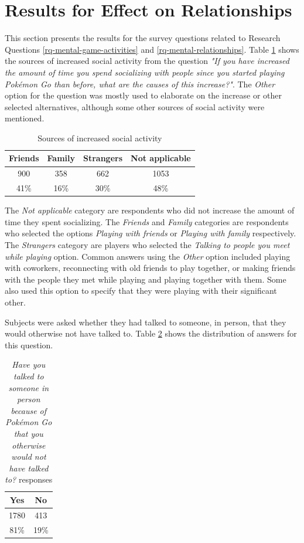 \section{Results for Effect on Relationships}

This section presents the results for the survey questions related to Research Questions \ref{rq-mental-game-activities} and \ref{rq-mental-relationships}. Table \ref{tbl:increased-social-activity-sources} shows the sources of increased social activity from the question \emph{"If you have increased the amount of time you spend socializing with people since you started playing Pokémon Go than before, what are the causes of this increase?"}. The \emph{Other} option for the question was mostly used to elaborate on the increase or other selected alternatives, although some other sources of social activity were mentioned.

\begin{table}[h]
	\centering
	\caption{Sources of increased social activity}
	\label{tbl:increased-social-activity-sources}
	\begin{tabular}{|c|c|c|c|}
		\hline
		\textbf{Friends} & \textbf{Family} & \textbf{Strangers} & \textbf{Not applicable}\\
		\hline\hline
		900		& 358	& 662	& 1053\\
		41\%	& 16\%	& 30\%	& 48\%\\\hline
	\end{tabular}
\end{table}

The \emph{Not applicable} category are respondents who did not increase the amount of time they spent socializing. The \emph{Friends} and \emph{Family} categories are respondents who selected the options \emph{Playing with friends} or \emph{Playing with family} respectively. The \emph{Strangers} category are players who selected the \emph{Talking to people you meet while playing} option. Common answers using the \emph{Other} option included playing with coworkers, reconnecting with old friends to play together, or making friends with the people they met while playing and playing together with them. Some also used this option to specify that they were playing with their significant other.

Subjects were asked whether they had talked to someone, in person, that they would otherwise not have talked to. Table \ref{tbl:talk-to-strangers} shows the distribution of answers for this question.

\begin{table}[h]
	\centering
	\caption{\emph{Have you talked to someone in person because of Pokémon Go that you otherwise would not have talked to?} responses}
	\label{tbl:talk-to-strangers}
	\begin{tabular}{|c|c|}
		\hline
		\textbf{Yes}	& \textbf{No}\\
		\hline\hline
		1780			& 413\\
		81\%			& 19\%\\\hline
	\end{tabular}
\end{table}

